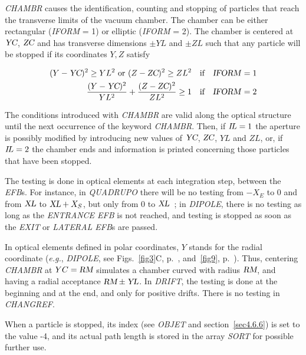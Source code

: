 \textsl{CHAMBR} causes the identification, counting and stopping of 
particles that reach the 
transverse limits of the vacuum chamber.  The chamber can be either rectangular 
(\textsl{IFORM} = 1) or elliptic (\textsl{IFORM} = 2). The chamber is centered
at $ \textsl{YC}$, $\textsl{ZC} $ and has transverse dimensions $\pm YL $ and  
$\pm  ZL $ such that any particle will be stopped if its coordinates $ Y,Z $ satisfy 

\begin{align*}
	(Y-\textsl{YC})^2\geq  YL^2  \text{ or }   (Z-\textsl{ZC})^2 \geq  ZL^2 
	   &   \quad \text{if}\quad  \text{\textsl{IFORM}}=1  \\
	\dfrac{ (Y-\textsl{YC})^2 }{ YL^2} + \dfrac{(Z-\textsl{ZC})^2 }{ ZL^2} \geq 1  
	  &   \quad \text{if}\quad  \text{\textsl{IFORM}}=2  
\end{align*}

\noindent The conditions introduced with \textsl{CHAMBR} are valid
along  the optical structure until the next occurrence  of the keyword \textsl{CHAMBR}.  Then, if
$ I\!L=1 $ the aperture is possibly modified by introducing new values of $ \textsl{YC}$,  $ \textsl{ZC}$, 
 $YL $ and $ ZL $, or, if $ I\!L=2 $ the chamber ends and information is 
printed concerning those particles that have been stopped.  
\bigskip

\noindent The testing is done in optical elements at each integration step, between the
\textsl{EFB}s. For instance, in \textsl{QUADRUPO} there will be 
no testing from $-X_E $ to 0 and 
from $ \textsl{XL} $ to $ \textsl{XL}+X_S $, but only from 0  to $ \textsl{XL} $~;  in \textsl{DIPOLE}, there is no 
testing as long as the \textsl{ENTRANCE EFB} is not reached, and testing is stopped as 
soon as the \textsl{EXIT} or \textsl{LATERAL EFB}s are passed.  
\bigskip

\noindent In optical elements defined in polar coordinates,  $ Y $  stands for the radial
coordinate (\emph{e.g.}, \textsl{DIPOLE}, see Figs.~\ref{fig3}C, p.~\pageref{fig3}, and~\ref{fig9}, 
p.~\pageref{fig9}).  
 Thus, centering \textsl{CHAMBR} at $ \\YC=\textsl{RM} $ simulates a chamber curved with radius 
 $ \textsl{RM} $, and having a radial acceptance $ \textsl{RM} \pm \textsl{YL} $.  In  \textsl{DRIFT}, the testing  is done 
 at the beginning and at the end, and only for positive drifts.  There 
is no testing in \textsl{CHANGREF}.  
\bigskip

\noindent When a particle is stopped, its index 
\IEX{}  (see \textsl{OBJET} and 
section~\ref{sec4.6.6}) is set to the value -4, and its actual path length is stored in the array 
\textsl{SORT} for possible further use. 




